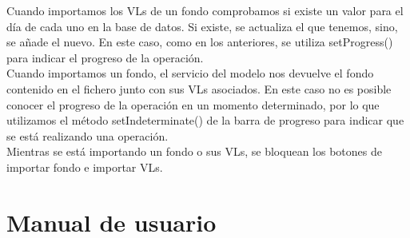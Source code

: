 \documentclass[12pt, a4paper]{book}
\begin{document}
\newpage

Cuando importamos los \gls{VL}s de un fondo comprobamos si existe un valor para el día de cada uno en la base de datos. Si existe, se actualiza el que tenemos, sino, se añade el nuevo. En este caso, como en los anteriores, se utiliza setProgress() para indicar el progreso de la operación.\\

Cuando importamos un fondo, el servicio del modelo nos devuelve el fondo contenido en el fichero junto con sus \gls{VL}s asociados. En este caso no es posible conocer el progreso de la operación en un momento determinado, por lo que utilizamos el método setIndeterminate() de la barra de progreso para indicar que se está realizando una operación.\\

Mientras se está importando un fondo o sus \gls{VL}s, se bloquean los botones de importar fondo e importar \gls{VL}s.
\newpage

\appendix
\chapter{Manual de usuario}\label{aped.A}


\cleardoublepage

\newpage
\end{document}

